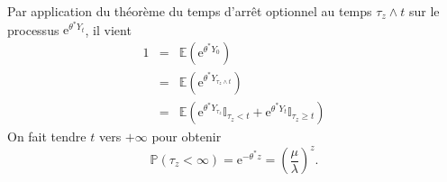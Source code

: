 \documentclass[11pts]{exam}
\newcommand*{\Prob}{\mathbb{P}}
\newcommand*{\E}{\mathbb{E}}
\newcommand*{\e}{\mathrm{e}}
\newcommand*{\ind}{\mathbb{I}}
\begin{document}
\begin{questions}
\begin{parts}
\begin{solution}
Par application du théorème du temps d'arrêt optionnel au temps $\tau_z\land t$ sur le processus $\e^{\theta^\ast Y_t}$, il vient 
\begin{eqnarray*}
1 &=&\E(\e^{\theta^\ast Y_0})\\
&=&\E(\e^{\theta^\ast Y_{\tau_z\land t}})\\
&=&\E(\e^{\theta^\ast Y_{\tau_z}}\ind_{\tau_z < t}+\e^{\theta^\ast Y_{t}}\ind_{\tau_z \geq t})
\end{eqnarray*}
On fait tendre $t$ vers $+\infty$ pour obtenir
$$
\Prob(\tau_z <\infty) = \e^{-\theta^\ast z} = \left(\frac{\mu}{\lambda}\right)^z.
$$
\end{solution}
\end{parts}
\end{questions}
\end{document}
